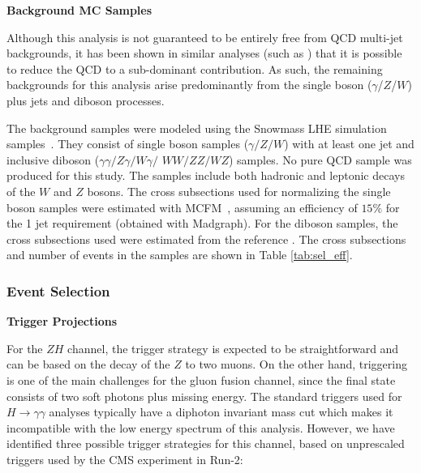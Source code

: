 \vspace{0.2cm} \textbf{Background MC Samples}

Although this analysis is not guaranteed to be entirely free from QCD multi-jet backgrounds, it has been shown in similar analyses (such as \cite{lowmonophoton}) that it is possible to reduce the QCD to a sub-dominant contribution. As such, the remaining backgrounds for this analysis arise predominantly from the single boson ($\gamma$/$Z$/$W$) plus jets and diboson processes.

The background samples were modeled using the Snowmass LHE simulation samples~\cite{Anderson:2013kxz}. They consist of single boson samples ($\gamma/Z/W$) with at least one jet and inclusive diboson ($\gamma\gamma/Z\gamma/W\gamma/$ $WW/ZZ/WZ$) samples. No pure QCD sample was produced for this study. The samples include both hadronic and leptonic decays of the $W$ and $Z$ bosons. The cross subsections used for normalizing the single boson samples were estimated with MCFM~\cite{mcfm}, assuming an efficiency of $15\%$ for the 1 jet requirement (obtained with Madgraph). For the diboson samples, the cross subsections used were estimated from the reference \cite{Campbell:2011bn}. The cross subsections and number of events in the samples are shown in Table \ref{tab:sel_eff}.


\subsubsection{Event Selection}

\vspace{0.2cm} \textbf{Trigger Projections}

For the $ZH$ channel, the trigger strategy is expected to be straightforward and can be based on the decay of the $Z$ to two muons.
%
%
On the other hand, triggering is one of the main challenges for the gluon fusion channel, since the final state consists of two soft photons plus missing energy. The standard triggers used for $H\rightarrow\gamma\gamma$ analyses typically have a diphoton invariant mass cut which makes it incompatible with the low energy spectrum of this analysis. However, we have identified three possible trigger strategies for this channel, based on  unprescaled triggers used by the CMS experiment in Run-2:

